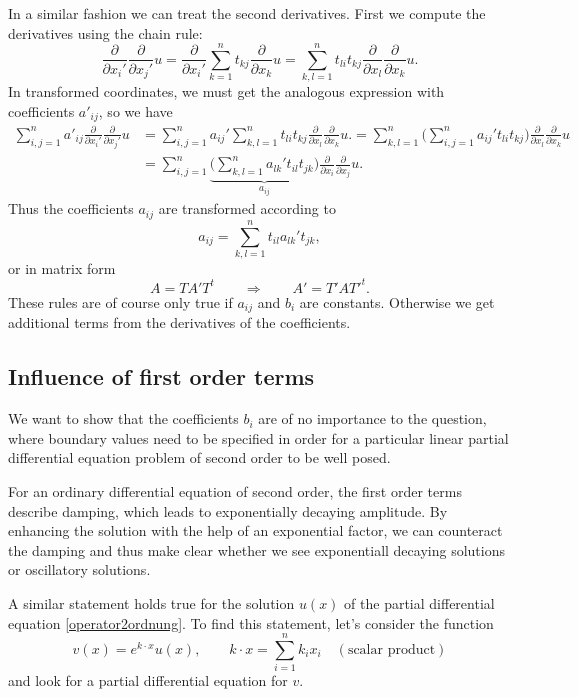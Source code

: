 In a similar fashion we can treat the second derivatives.
First we compute the derivatives using the chain rule:
\[
\frac{\partial}{\partial x_i'}\frac{\partial}{\partial x_j'} u
=
\frac{\partial}{\partial x_i'}
\sum_{k=1}^nt_{kj}\frac{\partial}{\partial x_k}u
=
\sum_{k,l=1}^nt_{li}t_{kj}\frac{\partial}{\partial x_l}\frac{\partial}{\partial x_k}u.
\]
In transformed coordinates, we must get the analogous expression
with coefficients $a'_{ij}$, so we have
\begin{align*}
\sum_{i,j=1}^n
a'_{ij}\frac{\partial}{\partial x_i'}\frac{\partial}{\partial x_j'} u
&=
\sum_{i,j=1}^n
a_{ij}'
\sum_{k,l=1}^n
t_{li}t_{kj}\frac{\partial}{\partial x_l}\frac{\partial}{\partial x_k}u.
=
\sum_{k,l=1}^n
\biggl(
\sum_{i,j=1}^n
a_{ij}'
t_{li}t_{kj}
\biggr)
\frac{\partial}{\partial x_l}\frac{\partial}{\partial x_k}u
\\
&=
\sum_{i,j=1}^n
\underbrace{
\biggl(
\sum_{k,l=1}^n
a_{lk}'
t_{il}t_{jk}
\biggr)}_{\textstyle a_{ij}}
\frac{\partial}{\partial x_i}\frac{\partial}{\partial x_j}u.
\end{align*}
Thus the coefficients
$a_{ij}$ are transformed according to
\[
a_{ij}=\sum_{k,l=1}^n t_{il}a_{lk}'t_{jk},
\]
or in matrix form
\[
A=TA'T^t
\qquad\Rightarrow\qquad
A'=T'AT'^t.
\]
These rules are of course only true if 
$a_{ij}$ and $b_i$ are constants.
Otherwise we get additional terms from the derivatives of the coefficients.

\subsection{Influence of first order terms
\label{einfluss-terme-erster-ordnung}}
We want to show that the coefficients $b_i$ are of no importance to
the question, where boundary values need to be specified in order
for a particular linear partial differential equation problem
of second order to be well posed.

For an ordinary differential equation of second order, the first
order terms describe damping, which leads to exponentially decaying
amplitude.
By enhancing the solution with the help of an exponential factor,
we can counteract the damping and thus make clear whether we see
exponentiall decaying solutions or oscillatory solutions.

A similar statement holds true for the solution $u(x)$
of the partial differential equation
\eqref{operator2ordnung}.
To find this statement, let's consider the function
\[
v(x)=e^{k\cdot x} u(x),
\qquad
k\cdot x = \sum_{i=1}^n k_ix_i \quad(\text{scalar product})
\]
and look for a partial differential equation for $v$.

